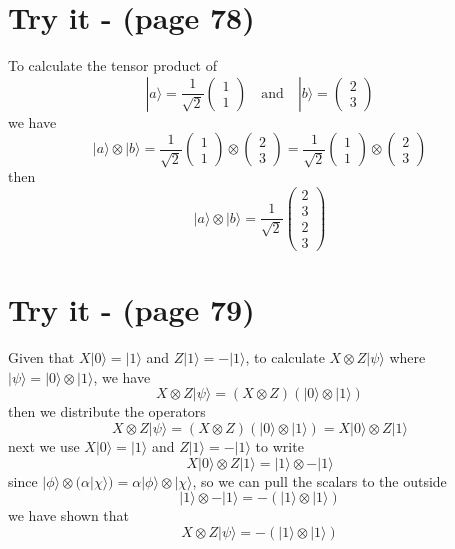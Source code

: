 \documentclass[12pt]{article}
\begin{document}
\section*{Try it - (page 78)}
To calculate the tensor product of
\[
|a\rangle = \frac{1}{\sqrt{2}} \begin{pmatrix} 1 \\ 1 \end{pmatrix} \quad \text{and} \quad |b\rangle = \begin{pmatrix} 2 \\ 3 \end{pmatrix}
\]
we have
\[
|a\rangle \otimes |b\rangle = \frac{1}{\sqrt{2}} \begin{pmatrix} 1 \\ 1 \end{pmatrix} \otimes \begin{pmatrix} 2 \\ 3 \end{pmatrix} = \frac{1}{\sqrt{2}} \begin{pmatrix} 1 \\ 1 \end{pmatrix} \otimes \begin{pmatrix} 2 \\ 3 \end{pmatrix}
\]
then
\[
|a\rangle \otimes |b\rangle = \frac{1}{\sqrt{2}} \begin{pmatrix} 2 \\ 3 \\ 2 \\ 3 \end{pmatrix}
\]
\section*{Try it - (page 79)}
Given that \( X|0\rangle = |1\rangle \) and \( Z|{1}\rangle = -|1\rangle \), to calculate \( X \otimes Z |\psi\rangle \) where \( |\psi\rangle = |0\rangle \otimes |1\rangle \), we have
\[
X \otimes Z |\psi\rangle = (X \otimes Z)(|0\rangle \otimes |1\rangle)
\]
then we distribute the operators
\[
X \otimes Z |\psi\rangle = (X \otimes Z)(|0\rangle \otimes |1\rangle) = X|0\rangle \otimes Z|1\rangle
\]
next we use  \( X|0\rangle = |1\rangle \) and \( Z|{1}\rangle = -|1\rangle \) to write
\[
X|0\rangle \otimes Z|1\rangle = |1\rangle \otimes -|1\rangle
\]
since \( |\phi\rangle \otimes (\alpha|\chi\rangle) = \alpha |\phi\rangle \otimes |\chi\rangle \), so we can pull the scalars to the outside
\[
|1\rangle \otimes -|1\rangle = -(|1\rangle \otimes |1\rangle)
\]
we have shown that
\[
X \otimes Z |\psi\rangle = -(|1\rangle \otimes |1\rangle)
\]
\end{document}
